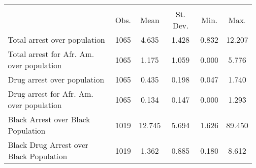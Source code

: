 {
\def\sym#1{\ifmmode^{#1}\else\(^{#1}\)\fi}
\begin{tabular}{l*{1}{ccccc}}
\hline\hline
                    &\multicolumn{5}{c}{}                                            \\
                    &        Obs.&        Mean&    St. Dev.&        Min.&        Max.\\
\hline
Total arrest over population&        1065&       4.635&       1.428&       0.832&      12.207\\
Total arrest for Afr. Am. over population&        1065&       1.175&       1.059&       0.000&       5.776\\
Drug arrest over population&        1065&       0.435&       0.198&       0.047&       1.740\\
Drug arrest for Afr. Am. over population&        1065&       0.134&       0.147&       0.000&       1.293\\
Black Arrest over Black Population&        1019&      12.745&       5.694&       1.626&      89.450\\
Black Drug Arrest over Black Population&        1019&       1.362&       0.885&       0.180&       8.612\\
\hline\hline
\end{tabular}
}

